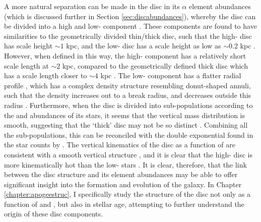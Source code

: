 A more natural separation can be made in the disc in its $\alpha$ element abundances (which is discussed further in Section \ref{sec:discabundances}), whereby the disc can be divided into a high and low-\afe{} component \citep[e.g.][]{1998A&A...338..161F,2003A&A...410..527B,2005A&A...433..185B,2013A&A...560A.109H,2014A&A...562A..71B,2014A&A...564A.115A,2014ApJ...796...38N,2015ApJ...808..132H}. These components are found to have similarities to the geometrically divided thin/thick disc, such that the high-\afe{} disc has scale height $\sim 1$ kpc, and the low-\afe{} disc has a scale height as low as $\sim 0.2$ kpc \citep[e.g.][]{2012ApJ...753..148B,2016ApJ...823...30B}. However, when defined in this way, the high-\afe{} component has a relatively short scale length at $\sim 2$ kpc, compared to the geometrically defined thick disc which has a scale length closer to $\sim4$ kpc \citep{2008ApJ...673..864J}. The low-\afe{} component has a flatter radial profile \citep{2012ApJ...752...51C}, which has a complex density structure resembling donut-shaped annuli, such that the density increases out to a break radius, and decreases outside this radius \citep{2012ApJ...753..148B,2016ApJ...823...30B}. Furthermore, when the disc is divided into sub-populations according to the \afe{} and \feh{} abundances of its stars, it seems that the vertical mass distribution is smooth, suggesting that the `thick' disc may not be so distinct \citep{2012ApJ...751..131B}. Combining all the sub-populations, this can be reconciled with the double exponential found in the star counts by \citet{1983MNRAS.202.1025G} \citep[see][]{2013A&ARv..21...61R}. The vertical kinematics of the disc as a function of \afe{} are consistent with a smooth vertical structure \citep{2012ApJ...755..115B}, and it is clear that the high-\afe{} disc is more kinematically hot than the low-\afe{} stars \citep[e.g.][]{2005A&A...433..185B}. It is clear, therefore, that the link between the disc structure and its element abundances may be able to offer significant insight into the formation and evolution of the galaxy. In Chapter \ref{chapter:apogeestruc}, I specifically study the structure of the disc not only as a function of \afe{} and \feh{}, but also in stellar age, attempting to further understand the origin of these disc components.

